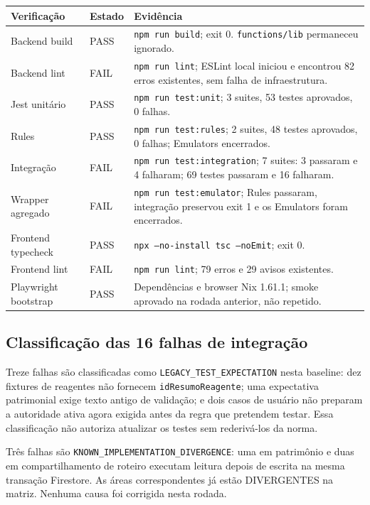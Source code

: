 \begin{longtable}{p{}p{}p{}}
\toprule
Verificação & Estado & Evidência \\
\midrule
\endhead
Backend build & PASS & \texttt{npm run build}; exit 0. \texttt{functions/lib} permaneceu ignorado. \\
Backend lint & FAIL & \texttt{npm run lint}; ESLint local iniciou e encontrou 82 erros existentes, sem falha de infraestrutura. \\
Jest unitário & PASS & \texttt{npm run test:unit}; 3 suites, 53 testes aprovados, 0 falhas. \\
Rules & PASS & \texttt{npm run test:rules}; 2 suites, 48 testes aprovados, 0 falhas; Emulators encerrados. \\
Integração & FAIL & \texttt{npm run test:integration}; 7 suites: 3 passaram e 4 falharam; 69 testes passaram e 16 falharam. \\
Wrapper agregado & FAIL & \texttt{npm run test:emulator}; Rules passaram, integração preservou exit 1 e os Emulators foram encerrados. \\
Frontend typecheck & PASS & \texttt{npx --no-install tsc --noEmit}; exit 0. \\
Frontend lint & FAIL & \texttt{npm run lint}; 79 erros e 29 avisos existentes. \\
Playwright bootstrap & PASS & Dependências e browser Nix 1.61.1; smoke aprovado na rodada anterior, não repetido. \\
\bottomrule
\end{longtable}

\subsection{Classificação das 16 falhas de integração}

Treze falhas são classificadas como \texttt{LEGACY\_TEST\_EXPECTATION} nesta
baseline: dez fixtures de reagentes não fornecem \texttt{idResumoReagente}; uma
expectativa patrimonial exige texto antigo de validação; e dois casos de usuário
não preparam a autoridade ativa agora exigida antes da regra que pretendem testar.
Essa classificação não autoriza atualizar os testes sem rederivá-los da norma.

Três falhas são \texttt{KNOWN\_IMPLEMENTATION\_DIVERGENCE}: uma em patrimônio e
duas em compartilhamento de roteiro executam leitura depois de escrita na mesma
transação Firestore. As áreas correspondentes já estão DIVERGENTES na matriz.
Nenhuma causa foi corrigida nesta rodada.

